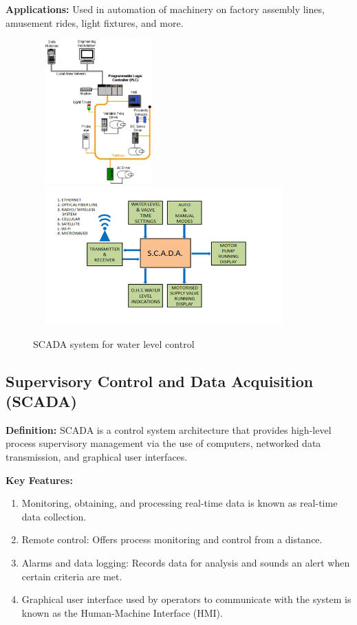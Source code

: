 \textbf{Applications:} Used in automation of machinery on factory
assembly lines, amusement rides, light fixtures, and more.


\begin{figure}[h!]
  \centering 
  \includegraphics[width=1.97887in,height=2.18448in]{figs/control_instrumentation/image9.png}
  \includegraphics[width=3.96887in,height=2.08876in]{figs/control_instrumentation/image10.png}
  \caption{SCADA system for water level control}
  \label{fig:SCADA system for water level control}
\end{figure}


\subsection{Supervisory Control and Data Acquisition (SCADA)}

\textbf{Definition:} SCADA is a control system architecture that
provides high-level process supervisory management via the use of
computers, networked data transmission, and graphical user interfaces.

\textbf{Key Features:}

\begin{enumerate}
\item
  Monitoring, obtaining, and processing real-time data is known as
  real-time data collection.
\item
  Remote control: Offers process monitoring and control from a distance.
\item
  Alarms and data logging: Records data for analysis and sounds an alert
  when certain criteria are met.
\item
  Graphical user interface used by operators to communicate with the
  system is known as the Human-Machine Interface (HMI).
\end{enumerate}

